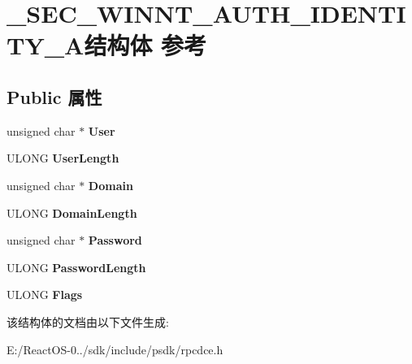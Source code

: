 \hypertarget{struct___s_e_c___w_i_n_n_t___a_u_t_h___i_d_e_n_t_i_t_y___a}{}\section{\+\_\+\+S\+E\+C\+\_\+\+W\+I\+N\+N\+T\+\_\+\+A\+U\+T\+H\+\_\+\+I\+D\+E\+N\+T\+I\+T\+Y\+\_\+\+A结构体 参考}
\label{struct___s_e_c___w_i_n_n_t___a_u_t_h___i_d_e_n_t_i_t_y___a}
\subsection*{Public 属性}
\begin{DoxyCompactItemize}
\item 
\mbox{\label{struct___s_e_c___w_i_n_n_t___a_u_t_h___i_d_e_n_t_i_t_y___a_a806eb909ed677e57c2b667a03257c74c}} 
unsigned char $\ast$ {\bfseries User}
\item 
\mbox{\label{struct___s_e_c___w_i_n_n_t___a_u_t_h___i_d_e_n_t_i_t_y___a_ab8e9f3121552437cf0bb99964484725e}} 
U\+L\+O\+NG {\bfseries User\+Length}
\item 
\mbox{\label{struct___s_e_c___w_i_n_n_t___a_u_t_h___i_d_e_n_t_i_t_y___a_a33edba53249ce9772f0c049844fc3862}} 
unsigned char $\ast$ {\bfseries Domain}
\item 
\mbox{\label{struct___s_e_c___w_i_n_n_t___a_u_t_h___i_d_e_n_t_i_t_y___a_a849e4c5073263948906414360948912c}} 
U\+L\+O\+NG {\bfseries Domain\+Length}
\item 
\mbox{\label{struct___s_e_c___w_i_n_n_t___a_u_t_h___i_d_e_n_t_i_t_y___a_afab0d03718956e084d1d39449af7019d}} 
unsigned char $\ast$ {\bfseries Password}
\item 
\mbox{\label{struct___s_e_c___w_i_n_n_t___a_u_t_h___i_d_e_n_t_i_t_y___a_ae58a02b36ab9ea4680da61236e637351}} 
U\+L\+O\+NG {\bfseries Password\+Length}
\item 
\mbox{\label{struct___s_e_c___w_i_n_n_t___a_u_t_h___i_d_e_n_t_i_t_y___a_a84fd4c14cdd4828428ec595115f61475}} 
U\+L\+O\+NG {\bfseries Flags}
\end{DoxyCompactItemize}


该结构体的文档由以下文件生成\+:\begin{DoxyCompactItemize}
\item 
E\+:/\+React\+O\+S-\/0../sdk/include/psdk/rpcdce.\+h\end{DoxyCompactItemize}
